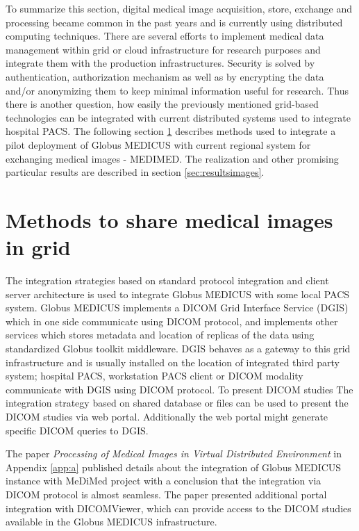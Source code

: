 
To summarize this section, digital medical image acquisition, store, exchange and processing became common in the past years and is currently using distributed computing techniques. There are several efforts to implement medical data management within grid or cloud infrastructure for research purposes and integrate them with the production infrastructures. Security is solved by authentication, authorization mechanism as well as by encrypting the data and/or anonymizing them to keep minimal information useful for research. Thus there is another question, how easily the previously mentioned grid-based technologies can be integrated with current distributed systems used to integrate hospital PACS. The following section \ref{sec:methodsimages} describes methods used to integrate a pilot deployment of Globus MEDICUS with current regional system for exchanging medical images - MEDIMED. The realization and other promising particular results are described in section \ref{sec:resultsimages}.

\section{Methods to share medical images in grid}
\label{sec:methodsimages}

The integration strategies based on standard protocol integration and client server architecture is used to integrate Globus MEDICUS with some local PACS system. Globus MEDICUS \cite{Erberich2006,Erberich2007} implements a DICOM Grid Interface Service (DGIS) which in one side communicate using DICOM protocol, and implements other services which stores metadata and location of replicas of the data using standardized Globus toolkit middleware. DGIS behaves as a gateway to this grid infrastructure and is usually installed on the location of integrated third party system; hospital PACS, workstation PACS client or DICOM modality communicate with DGIS using DICOM protocol.
To present DICOM studies The integration strategy based on shared database or files can be used to present the DICOM studies via web portal. Additionally the web portal might generate specific DICOM queries to DGIS.

The paper \cite{kulhanek2009}  \emph{Processing of Medical Images in Virtual Distributed Environment} in Appendix \ref{app:a} published details about the integration of Globus MEDICUS instance with MeDiMed project with a conclusion that the integration via DICOM protocol is almost seamless. The paper \cite{Kulhanek2008Mefanet} presented additional portal integration with DICOMViewer, which can provide access to the DICOM studies available in the Globus MEDICUS infrastructure.



